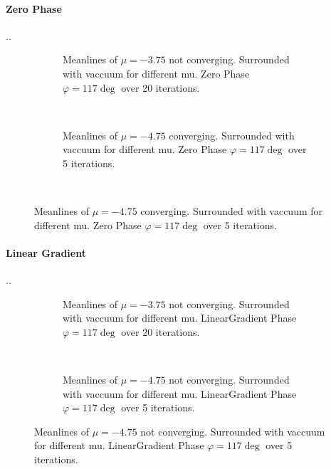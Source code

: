 \documentclass[../main.tex]{subfiles}
\begin{document}
\paragraph{Zero Phase}..
\begin{figure}[H]
    \centering
    \begin{subfigure}{0.4\textwidth}
        \centering
        \hspace{-4cm} %
        
        \caption{Meanlines of $\mu = -3.75$ not converging. Surrounded with vaccuum for different mu. Zero Phase $\varphi = 117\deg$ over 20 iterations.}
        \label{fig:first}
        \end{subfigure}    \\
        \begin{subfigure}{0.4\textwidth}
            \centering
            \hspace{-4cm} %
            
            \caption{Meanlines of $\mu = -4.75$ converging. Surrounded with vaccuum for different mu. Zero Phase $\varphi = 117\deg$  over 5 iterations.}
            \label{fig:first}
            \end{subfigure}    \\

\end{figure}

\paragraph{Linear Gradient}..
\begin{figure}[H]
    \begin{subfigure}{0.4\textwidth}
        \centering
    \hspace{-4cm} %
    
    \caption{Meanlines of $\mu = -3.75$ not converging. Surrounded with vaccuum for different mu. LinearGradient Phase $\varphi = 117\deg$  over 20 iterations.}
    \label{fig:first}
    \end{subfigure}    \\
    \begin{subfigure}{0.4\textwidth}
        \centering
    \hspace{-4cm} %
    
    \caption{Meanlines of $\mu = -4.75$ not converging. Surrounded with vaccuum for different mu. LinearGradient Phase $\varphi = 117\deg$  over 5 iterations.}
    \label{fig:first}
    \end{subfigure}    
\end{figure}
\end{document}
